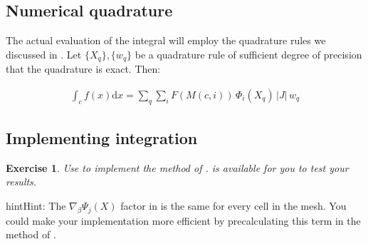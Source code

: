 \documentclass{book}
\newtheorem{exercise}{Exercise}
\begin{document}
\subsection{Numerical quadrature}
\label{\detokenize{5_functions:numerical-quadrature}}
The actual evaluation of the integral will employ the quadrature rules
we discussed in {\hyperref[\detokenize{1_quadrature::doc}]{}}. Let \(\{X_q\},
\{w_q\}\) be a quadrature rule of sufficient degree of precision that
the quadrature is exact. Then:

\label{\detokenize{5_functions:equation-integration}}\begin{equation}\label{equation:5_functions:integration}
\begin{split}\int_c f(x)\mathrm{d}x  = \sum_q \sum_i F(M(c,i))\,\Phi_i(X_q)\, |J|\,w_q\end{split}
\end{equation}

\subsection{Implementing integration}
\label{\detokenize{5_functions:implementing-integration}}
\begin{exercise}
Use {\hyperref[\detokenize{5_functions:equation-jacobian}]{}} to implement the
 method of
.  is
available for you to test your results.
\end{exercise}
\begin{sphinxadmonition}{hint}{Hint:}
The \(\nabla_\beta\Psi_j(X)\) factor in {\hyperref[\detokenize{5_functions:equation-jacobian}]{}} is the same
for every cell in the mesh. You could make your implementation more
efficient by precalculating this term in the 
method of .
\end{sphinxadmonition}
\end{document}
